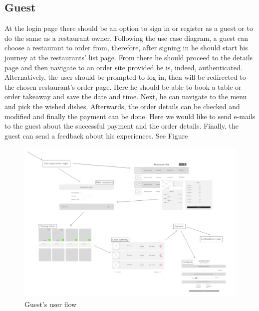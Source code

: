 \subsection{Guest}\label{GuestUserflow}
At the login page there should be an option to sign in or register as a guest or to do the same as a restaurant owner. Following the use case diagram, a guest can choose a restaurant to order from, therefore, after signing in he should start his journey at the restaurants' list page. From there he should proceed to the details page and then navigate to an order site provided he is, indeed, authenticated. Alternatively, the user should be prompted to log in, then will be redirected to the chosen restaurant's order page. Here he should be able to book a table or order takeaway and save the date and time. Next, he can navigate to the menu and pick the wished dishes. Afterwards, the order details can be checked and modified and finally the payment can be done. Here we would like to send e-mails to the guest about the successful payment and the order details. Finally, the guest can send a feedback about his experiences. See Figure 
\begin{figure}[!ht]
	\centering
	\includegraphics[width=150mm, keepaspectratio]{figures/UIsGuest.png}
	\caption{Guest's user flow} 
	\label{fig:UIsGuest}
\end{figure}
